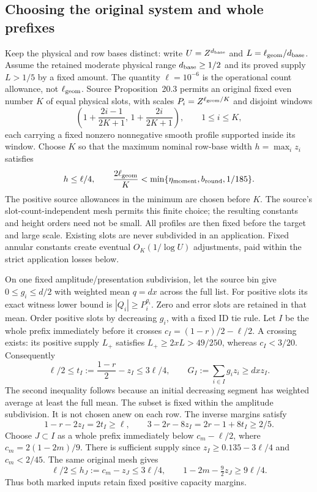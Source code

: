 \documentclass[11pt]{article}
\theoremstyle{definition}
\begin{document}
\subsection{Choosing the original system and whole prefixes}
Keep the physical and row bases distinct: write
$U=Z^{d_{\rm base}}$ and $L=\ell_{\rm geom}/d_{\rm base}$.
Assume the retained moderate physical range $d_{\rm base}\ge1/2$
and its proved supply $L>1/5$ by a fixed amount.  The quantity
$\ell=10^{-6}$ is the operational count allowance, not
$\ell_{\rm geom}$.  Source Proposition~20.3 permits an original fixed
even number $K$ of equal physical slots, with scales
$P_i=Z^{\ell_{\rm geom}/K}$ and disjoint windows
\[
 \left(1+\frac{2i-1}{2K+1},\,
             1+\frac{2i}{2K+1}\right),\qquad 1\le i\le K,
\]
each carrying a fixed nonzero nonnegative smooth profile supported
inside its window.  Choose $K$ so that the maximum nominal row-base
width $h=\max_i z_i$ satisfies
\begin{equation}
 h\le\ell/4,
 \qquad \frac{2\ell_{\rm geom}}K
   <\min\{\eta_{\rm moment},b_{\rm round},1/185\}.
 \label{slot-eq-original-mesh}
\end{equation}
The positive source allowances in the minimum are chosen before $K$.
The source's slot-count-independent mesh permits this finite choice;
the resulting constants and height orders need not be small.
All profiles are then fixed before the target and large scale.
Existing slots are never subdivided in an application.  Fixed annular
constants create eventual $O_K(1/\log U)$ adjustments, paid within the
strict application losses below.

On one fixed amplitude/presentation subdivision, let the source bin
give $0\le g_i\le d/2$ with weighted mean $q=dx$ across the full list.
For positive slots its exact witness lower bound is
$|Q_i|\ge P_i^{g_i}$.  Zero and error slots are retained in that mean.
Order positive slots by decreasing $g_i$, with a fixed ID tie rule.
Let $I$ be the whole prefix immediately before it crosses
$c_I=(1-r)/2-\ell/2$.  A crossing exists: its positive supply $L_+$
satisfies $L_+\ge2xL>49/250$, whereas $c_I<3/20$.
Consequently
\begin{equation}
 \ell/2\le t_I:=\frac{1-r}{2}-z_I\le3\ell/4,
 \qquad G_I:=\sum_{i\in I}g_i z_i\ge dx z_I.
 \label{slot-eq-inverse-prefix}
\end{equation}
The second inequality follows because an initial decreasing segment
has weighted average at least the full mean.  The subset is fixed
within the amplitude subdivision.  It is not chosen anew on each row.
The inverse margins satisfy
\[
 1-r-2z_I=2t_I\ge\ell,\qquad
 3-2r-8z_I=2r-1+8t_I\ge2/5.
\]
Choose $J\subset I$ as a whole prefix immediately below
$c_m-\ell/2$, where $c_m=2(1-2m)/9$.
There is sufficient supply since $z_I\ge0.135-3\ell/4$
and $c_m<2/45$.  The same original mesh gives
\begin{equation}
 \ell/2\le h_J:=c_m-z_J\le3\ell/4,
 \qquad 1-2m-\tfrac92z_J\ge9\ell/4.
 \label{slot-eq-fourth-prefix}
\end{equation}
Thus both marked inputs retain fixed positive capacity margins.
\end{document}
